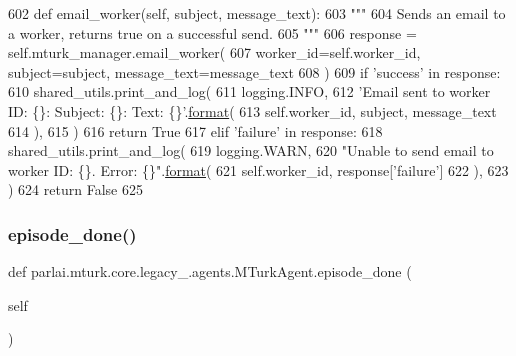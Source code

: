 \begin{DoxyCode}
602     \textcolor{keyword}{def }email\_worker(self, subject, message\_text):
603         \textcolor{stringliteral}{"""}
604 \textcolor{stringliteral}{        Sends an email to a worker, returns true on a successful send.}
605 \textcolor{stringliteral}{        """}
606         response = self.mturk\_manager.email\_worker(
607             worker\_id=self.worker\_id, subject=subject, message\_text=message\_text
608         )
609         \textcolor{keywordflow}{if} \textcolor{stringliteral}{'success'} \textcolor{keywordflow}{in} response:
610             shared\_utils.print\_and\_log(
611                 logging.INFO,
612                 \textcolor{stringliteral}{'Email sent to worker ID: \{\}: Subject: \{\}: Text: \{\}'}.\hyperlink{namespaceparlai_1_1chat__service_1_1services_1_1messenger_1_1shared__utils_a32e2e2022b824fbaf80c747160b52a76}{format}(
613                     self.worker\_id, subject, message\_text
614                 ),
615             )
616             \textcolor{keywordflow}{return} \textcolor{keyword}{True}
617         \textcolor{keywordflow}{elif} \textcolor{stringliteral}{'failure'} \textcolor{keywordflow}{in} response:
618             shared\_utils.print\_and\_log(
619                 logging.WARN,
620                 \textcolor{stringliteral}{"Unable to send email to worker ID: \{\}. Error: \{\}"}.\hyperlink{namespaceparlai_1_1chat__service_1_1services_1_1messenger_1_1shared__utils_a32e2e2022b824fbaf80c747160b52a76}{format}(
621                     self.worker\_id, response[\textcolor{stringliteral}{'failure'}]
622                 ),
623             )
624             \textcolor{keywordflow}{return} \textcolor{keyword}{False}
625 
\end{DoxyCode}
\mbox{\label{classparlai_1_1mturk_1_1core_1_1legacy__2018_1_1agents_1_1MTurkAgent_ab989adcb9b0f2c2cdb3ec43445ea660c}} 
\subsubsection{\texorpdfstring{episode\+\_\+done()}{episode\_done()}}
{\footnotesize\ttfamily def parlai.\+mturk.\+core.\+legacy\+\_.\+agents.\+M\+Turk\+Agent.\+episode\+\_\+done (\begin{DoxyParamCaption}\item[{}]{self }\end{DoxyParamCaption})}

